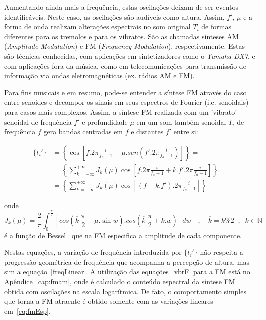 Aumentando ainda mais a frequência, estas oscilações
deixam de ser eventos identificáveis. 
Neste caso, as oscilações são
audíveis como altura. Assim, $f'$, $\mu$ e a forma de onda realizam alterações espectrais no som
original $T_i$ de formas diferentes para os tremolos e para os vibratos. São as 
chamadas sínteses AM (\emph{Amplitude Modulation}) e FM (\emph{Frequency Modulation}), respectivamente.
Estas são técnicas conhecidas, com aplicações em sintetizadores
como o \emph{Yamaha DX7}, e com aplicações fora da música, como em telecomunicações para transmissão de informação via ondas eletromagnéticas (ex. rádios AM e FM).

Para fins musicais e em resumo, pode-se entender a síntese FM através do caso entre senoides
e decompor os sinais em seus espectros de Fourier (i.e. senoidais) para casos mais complexos.
Assim, a síntese FM realizada com um 'vibrato' senoidal de frequência $f'$ e profundidade $\mu$ em um som também senoidal $T_i$ de frequência $f$
gera bandas centradas em $f$ e distantes $f'$ entre si:

\begin{equation}\label{eq:fmEsp}
\begin{split}
\{t_i'\} & = \left \{ \cos \left [f . 2 \pi \frac{i}{f_a-1} + \mu . sen \left ( f' . 2 \pi \frac{i}{ f_a -1 } \right ) \right ] \right \} = \\
 & = \left \{ \sum_{k=-\infty}^{+\infty} J_k(\mu) \cos \left [ f . 2 \pi \frac{i}{f_a-1} + k . f' . 2 \pi \frac{i}{f_a-1} \right ]  \right \} = \\
 & = \left \{ \sum_{k=-\infty}^{+\infty} J_k(\mu) \cos \left [ (f+k.f') . 2 \pi \frac{i}{f_a-1} \right ]  \right \}
\end{split}
\end{equation}

onde 
\begin{equation}\label{eq:Bessel}
J_k(\mu) = \frac{2}{\pi} \int_0^{\frac{\pi}{2}}\left [ cos \left (\overline{k}\;\frac{\pi}{2} + \mu . \sin w \right ) . cos \left ( \overline{k}\;\frac{\pi}{2} + k . w \right ) \right ] dw \quad , \quad \overline{k} = k \% 2 \;\;,\;\; k \in \mathbb{N}
\end{equation}
é a função de Bessel~\cite{BesselCCRMA,JOSFM} que na FM especifica a amplitude de cada componente. 

Nestas equações, a variação de frequência introduzida por $\{t_i'\}$ não respeita a progressão geométrica de frequência que acompanha a percepção de altura, mas sim a equação~\ref{freqLinear}. A utilização das equações~\ref{vbrF} para a FM está no Apêndice~\ref{cap:fmam}, onde é calculado o conteúdo espectral da síntese FM obtida com oscilações na escala logarítmica. De fato, o comportamento simples que torna a FM atraente é obtido somente com as variações lineares em~\ref{eq:fmEsp}.

